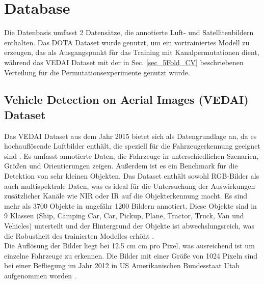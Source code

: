 \section{Database}
Die Datenbasis umfasst 2 Datensätze, die annotierte Luft- und Satellitenbildern enthalten. Das \acrshort{DOTA} Dataset wurde genutzt, um ein vortrainiertes Modell zu erzeugen, das als Ausgangspunkt für das Training mit Kanalpermutationen dient, während das \acrshort{VEDAI} Dataset mit der in Sec. \ref{sec_5Fold_CV} beschriebenen Verteilung für die Permutationsexperimente genutzt wurde.
\subsection{Vehicle Detection on Aerial Images (VEDAI) Dataset}
\label{subsec:VEDAI}

Das \Acrshort{VEDAI} Dataset \cite{vedai_web}  aus dem Jahr 2015 bietet sich als Datengrundlage an, da es hochauflösende Luftbilder enthält, die speziell für die Fahrzeugerkennung geeignet sind \cite{Razakarivony2015}. Es umfasst annotierte Daten, die Fahrzeuge in unterschiedlichen Szenarien, Größen und Orientierungen zeigen. Außerdem ist es ein Benchmark für die Detektion von sehr kleinen Objekten. Das Dataset enthält sowohl \acrshort{RGB}-Bilder als auch multispektrale Daten, was es ideal für die Untersuchung der Auswirkungen zusätzlicher Kanäle wie \acrshort{NIR} oder \acrshort{IR} auf die Objekterkennung macht. Es sind mehr als 3700 Objekte in ungefähr 1200 Bildern annotiert. Diese Objekte sind in 9 Klassen (Ship, Camping Car, Car, Pickup, Plane, Tractor, Truck, Van und Vehicles) unterteilt und der Hintergrund der Objekte ist abwechslungsreich, was die Robustheit des trainierten Modelles erhöht \cite{Razakarivony2015}. \\
Die Auflösung der Bilder liegt bei 12.5 cm  cm pro Pixel, was ausreichend ist um einzelne Fahrzeuge zu erkennen. Die Bilder mit einer Größe von 1024  Pixeln sind bei einer Befliegung im Jahr 2012 in US Amerikanischen Bundesstaat Utah aufgenommen worden \cite{Razakarivony2015}. 



